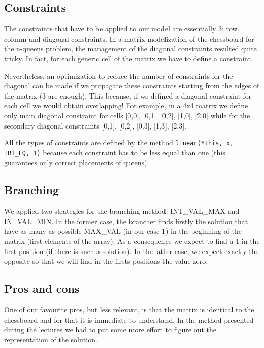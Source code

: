 \documentclass[a4paper, 11pt]{article}
\begin{document}
\subsection{Constraints}

The constraints that have to be applied to our model are essentially 3: row, column and diagonal constraints. In a matrix modelization of the chessboard for the n-queens problem, the management of the diagonal constraints resulted quite tricky. In fact, for each generic cell of the matrix we have to define a constraint. 

Nevertheless, an optimization to reduce the number of constraints for the diagonal can be made if we propagate these constraints starting from the edges of the matrix (3 are enough). This because, if we defined a diagonal constraint for each cell we would obtain overlapping! For example, in a 4x4 matrix we define only main diagonal constraint for cells [0,0], [0,1], [0,2], [1,0], [2,0] while for the secondary diagonal constraints [0,1], [0,2], [0,3], [1,3], [2,3].

All the types of constraints are defined by the method \texttt{linear(*this, x, IRT\_LQ, 1)} because each constraint has to be less equal than one (this guarantees only correct placements of queens).

\subsection{Branching}

We applied two strategies for the branching method: INT\_VAL\_MAX and IN\_VAL\_MIN. In the former case, the brancher finds firstly the solution that have as many as possible MAX\_VAL (in our case 1) in the beginning of the matrix (first elements of the array). As a consequence we expect to find a 1 in the first position (if there is such a solution). In the latter case, we expect exactly the opposite so that we will find in the firsts positions the value zero.

\subsection{Pros and cons}

One of our favourite pros, but less relevant, is that the matrix is identical to the chessboard and for that it is immediate to understand. In the method presented during the lectures we had to put some more effort to figure out the representation of the solution. 
\end{document}
